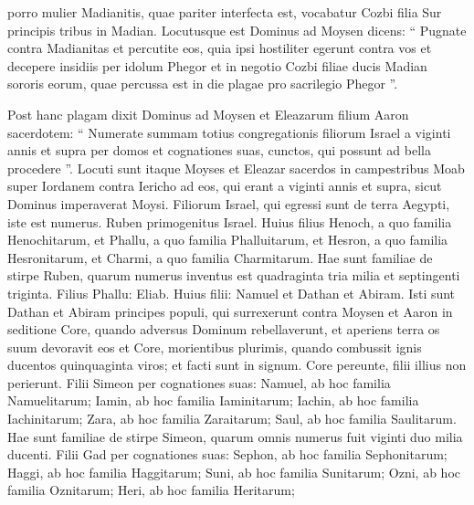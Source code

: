 \begin{biblechapter}
\begin{biblechapter}
\begin{biblechapter}
\begin{biblechapter}
\begin{biblechapter}
\begin{biblechapter}
\begin{biblechapter}
\begin{biblechapter}
\begin{biblechapter}
\begin{biblechapter}
\begin{biblechapter}
\begin{biblechapter}
\begin{biblechapter}
\begin{biblechapter}
\begin{biblechapter}
\begin{biblechapter}
\begin{biblechapter}
\begin{biblechapter}
\begin{biblechapter}
\begin{biblechapter}
\begin{biblechapter}
\begin{biblechapter}
\begin{biblechapter}
\begin{biblechapter}
\begin{biblechapter}
\verse porro mulier Madianitis, quae pariter interfecta est, vocabatur Cozbi filia Sur principis tribus in Madian.
 \verse Locutusque est Dominus ad Moysen dicens: 
\verse “ Pugnate contra Madianitas et percutite eos, 
\verse quia ipsi hostiliter egerunt contra vos et decepere insidiis per idolum Phegor et in negotio Cozbi filiae ducis Madian sororis eorum, quae percussa est in die plagae pro sacrilegio Phegor ”.
 
\begin{biblechapter}
\verse Post hanc plagam dixit Dominus ad Moysen et Eleazarum filium Aaron sacerdotem: 
\verse “ Numerate summam totius congregationis filiorum Israel a viginti annis et supra per domos et cognationes suas, cunctos, qui possunt ad bella procedere ”. 
\verse Locuti sunt itaque Moyses et Eleazar sacerdos in campestribus Moab super Iordanem contra Iericho ad eos, qui erant 
\verse a viginti annis et supra, sicut Dominus imperaverat Moysi.
 Filiorum Israel, qui egressi sunt de terra Aegypti, iste est numerus.
 \verse Ruben primogenitus Israel. Huius filius Henoch, a quo familia Henochitarum, et Phallu, a quo familia Phalluitarum, 
\verse et Hesron, a quo familia Hesronitarum, et Charmi, a quo familia Charmitarum. 
\verse Hae sunt familiae de stirpe Ruben, quarum numerus inventus est quadraginta tria milia et septingenti triginta. 
 \verse Filius Phallu: Eliab. 
\verse Huius filii: Namuel et Dathan et Abiram. Isti sunt Dathan et Abiram principes populi, qui surrexerunt contra Moysen et Aaron in seditione Core, quando adversus Dominum rebellaverunt, 
\verse et aperiens terra os suum devoravit eos et Core, morientibus plurimis, quando combussit ignis ducentos quinquaginta viros; et facti sunt in signum. 
\verse Core pereunte, filii illius non perierunt.
 \verse Filii Simeon per cognationes suas: Namuel, ab hoc familia Namuelitarum; Iamin, ab hoc familia Iaminitarum; Iachin, ab hoc familia Iachinitarum; 
\verse Zara, ab hoc familia Zaraitarum; Saul, ab hoc familia Saulitarum. 
\verse Hae sunt familiae de stirpe Simeon, quarum omnis numerus fuit viginti duo milia ducenti.
 \verse Filii Gad per cognationes suas: Sephon, ab hoc familia Sephonitarum; Haggi, ab hoc familia Haggitarum; Suni, ab hoc familia Sunitarum; 
\verse Ozni, ab hoc familia Oznitarum; Heri, ab hoc familia Heritarum; 

\end{biblechapter}
\end{biblechapter}
\end{biblechapter}
\end{biblechapter}
\end{biblechapter}
\end{biblechapter}
\end{biblechapter}
\end{biblechapter}
\end{biblechapter}
\end{biblechapter}
\end{biblechapter}
\end{biblechapter}
\end{biblechapter}
\end{biblechapter}
\end{biblechapter}
\end{biblechapter}
\end{biblechapter}
\end{biblechapter}
\end{biblechapter}
\end{biblechapter}
\end{biblechapter}
\end{biblechapter}
\end{biblechapter}
\end{biblechapter}
\end{biblechapter}
\end{biblechapter}
